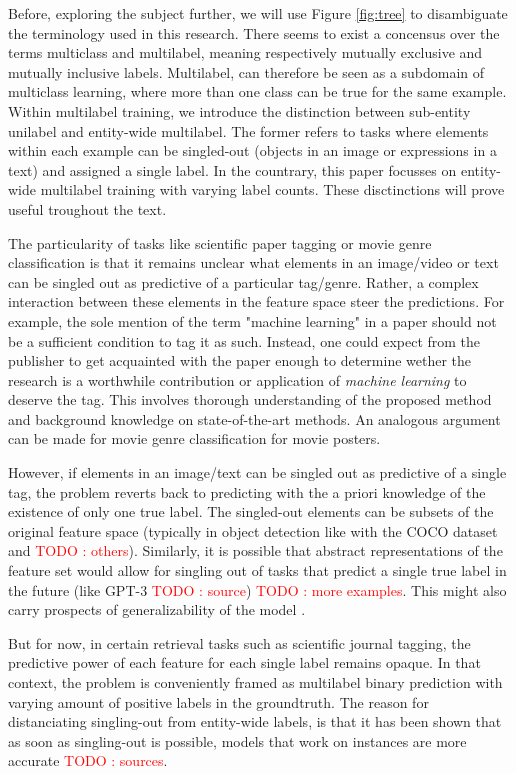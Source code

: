 \documentclass[sigconf,natbib,screen=true,review=true,anonymous]{acmart}
\newcommand\todo[1]{\textcolor{red}{TODO : #1}}
\begin{document}
Before, exploring the subject further, we will use Figure \ref{fig:tree} to disambiguate the terminology used in this research. There seems to exist a concensus over the terms multiclass and multilabel, meaning respectively mutually exclusive and mutually inclusive labels. Multilabel, can therefore be seen as a subdomain of multiclass learning, where more than one class can be true for the same example. Within multilabel training, we introduce the distinction between sub-entity unilabel and entity-wide multilabel. The former refers to tasks where elements within each example can be singled-out (objects in an image or expressions in a text) and assigned a single label. In the countrary, this paper focusses on entity-wide multilabel training with varying label counts. These disctinctions will prove useful troughout the text.

The particularity of tasks like scientific paper tagging or movie genre classification is that it remains unclear what elements in an image/video or text can be singled out as predictive of a particular tag/genre. Rather, a complex interaction between these elements in the feature space steer the predictions. For example, the sole mention of the term "machine learning" in a paper should not be a sufficient condition to tag it as such. Instead, one could expect from the publisher to get acquainted with the paper enough to determine wether the research is a worthwhile contribution or application of \emph{machine learning} to deserve the tag. This involves thorough understanding of the proposed method and background knowledge on state-of-the-art methods. An analogous argument can be made for movie genre classification for movie posters.

However, if elements in an image/text can be singled out as predictive of a single tag, the problem reverts back to predicting with the a priori knowledge of the existence of only one true label. The singled-out elements can be subsets of the original feature space (typically in object detection like with the COCO dataset  \cite{COCO} and \todo{others}). Similarly, it is possible that abstract representations of the feature set would allow for singling out of tasks that predict a single true label in the future  (like GPT-3 \todo{source}) \todo{more examples}. This might also carry prospects of generalizability of the model \cite{generalization}. 

But for now, in certain retrieval tasks such as scientific journal tagging, the predictive power of each feature for each single label remains opaque. In that context, the problem is conveniently framed as multilabel binary prediction with varying amount of positive labels in the groundtruth. The reason for distanciating singling-out from entity-wide labels, is that it has been shown that as soon as singling-out is possible, models that work on instances are more accurate \todo{sources}.
\end{document}
